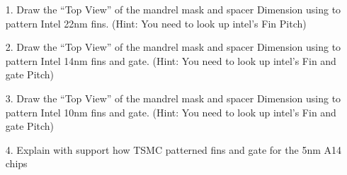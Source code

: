 \documentclass[main.tex]{subfiles}
\begin{document}
\begin{enumerate}
    \item [1.] Draw the “Top View” of the mandrel mask and spacer Dimension using to pattern Intel 22nm fins.  (Hint: You need to look up intel’s Fin Pitch)

    \item [2.] Draw the “Top View” of the mandrel mask and spacer Dimension using to pattern Intel 14nm fins and gate.  (Hint: You need to look up intel’s Fin and gate Pitch)

    \item [3.] Draw the “Top View” of the mandrel mask and spacer Dimension using to pattern Intel 10nm fins and gate.  (Hint: You need to look up intel’s Fin and gate Pitch)

    \item [4.] Explain with support how TSMC patterned fins and gate for the 5nm A14 chips
    
\end{enumerate}
\end{document}
